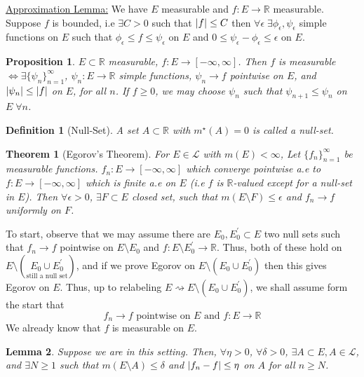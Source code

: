 \documentclass[11pt]{article}
\DeclarePairedDelimiter{\card}{\lvert}{\rvert}
\newtheorem{theorem}{Theorem}[section]
\newtheorem*{prop}{Proposition}
\newtheorem{lemma}[theorem]{Lemma}
\newtheorem{definition}{Definition}[section]
\newcommand{\mstar}[1]{m^{\star}\left(#1\right)}
\newcommand{\pr}{^{\prime}}
\newcommand{\R}{\mathbb{R}}
\newcommand{\Le}{\mathcal{L}}
\begin{document}
    \underline{Approximation Lemma:} We have $E$ measurable and $f: E \rightarrow \R$ measurable.
    Suppose $f$ is bounded, i.e $\exists C > 0$ such that $\card{f} \leq C$ then $\forall \epsilon \; \exists \phi_{\epsilon}, \psi_{\epsilon}$ simple functions on $E$ such that $\phi_{\epsilon} \leq f \leq \psi_{\epsilon}$  on $E$ and $0 \leq \psi_{\epsilon} - \phi_{\epsilon} \leq \epsilon$ on $E$.

    \begin{prop}
        $E \subset \R$ measurable, $f: E \rightarrow [-\infty, \infty]$.
        Then $f$ is measurable $\iff \exists \{ \psi_n\}_{n=1}^{\infty}$, $\psi_{n}: E \rightarrow \R$ simple functions, $\psi_n \rightarrow f$ pointwise on $E$, and $\card{\psi_n} \leq \card{f}$ on $E$, for all $n$.
        If $f \geq 0$, we may choose $\psi_n$ such that $\psi_{n+1} \leq \psi_n$ on $E \; \forall n$.
    \end{prop}

    \begin{definition}[Null-Set]
        A set $A \subset \R$ with $\mstar{A} = 0$ is called a null-set.
    \end{definition}

    \begin{theorem}[Egorov's Theorem]
        For $E \in \Le$ with $m(E) < \infty$, Let $\{ f_n \}_{n=1}^{\infty}$ be measurable functions.
        $f_n : E \rightarrow [-\infty, \infty]$ which converge pointwise a.e to $f: E \rightarrow [-\infty, \infty]$ which is finite a.e on $E$ (i.e $f$ is $\R$-valued except for a null-set in $E$).
        Then $\forall \epsilon > 0$, $\exists F \subset E$ closed set, such that $m(E \setminus F) \leq \epsilon$ and $f_n \rightarrow f$ uniformly on $F$.
    \end{theorem}

    To start, observe that we may assume there are $E_0, E_0 \pr \subset E$ two null sets such that $f_n \rightarrow f$ pointwise on $E \setminus E_0$ and $f: E \setminus E_0 \pr \rightarrow \R$.
    Thus, both of these hold on $E \setminus (\underset{\text{still a null set}}{E_0 \cup E_0 \pr} )$, and if we prove Egorov on $ E \setminus (E_0 \cup E_0 \pr)$ then this gives Egorov on $E$.
    Thus, up to relabeling $E \rightsquigarrow E \setminus (E_0 \cup E_0 \pr)$, we shall assume form the start that
    \[
        \boxed{f_n \rightarrow f \text{ pointwise on } E \text{ and } f: E \rightarrow \R}
    \]
    We already know that $f$ is measurable on $E$.

    \begin{lemma}
        Suppose we are in this setting.
        Then, $\forall \eta > 0$, $\forall \delta > 0$, $\exists A \subset E, A \in \Le$, and $\exists N \geq 1$ such that $m(E \setminus A) \leq \delta$ and $\card{f_n - f} \leq \eta$ on $A$ for all $n \geq N$.
    \end{lemma}
\end{document}
